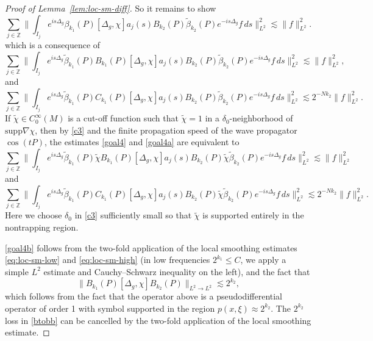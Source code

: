 \documentclass[10pt]{amsart}
\newcommand{\supp}{\mathrm{supp }}
\newcommand{\1}{{\bf 1}}
\begin{document}
\begin{proof}[Proof of Lemma~\ref{lem:loc-sm-diff}]
So it remains to show 
\begin{equation}\label{goal3}
   \sum_{j\in \mathbb{Z}}\| \int_{I_j} e^{is\Delta_{{g}}} \beta_{k_1}( P)[\Delta_g, \chi] a_j(s) B_{k_2}(P)\tilde\beta_{k_2}(P)   e^{-is\Delta_g}f\,ds\|^2_{L^2}\lesssim \|f\|^2_{L^2}.
\end{equation}
which is a consequence of 
\begin{equation}\label{goal4}
   \sum_{j\in \mathbb{Z}} \| \int_{I_j} e^{is\Delta_{{g}}}\tilde\beta_{k_1}(P)B_{k_1}(P)[\Delta_g, \chi]a_j(s) B_{k_2}(P)\tilde\beta_{k_2}(P)  e^{-is\Delta_g}f\,ds\|^2_{L^2}\lesssim \|f\|^2_{L^2},
\end{equation}
and 
\begin{equation}\label{goal4a}
  \sum_{j\in \mathbb{Z}} \| \int_{I_j} e^{is\Delta_{{g}}}\tilde\beta_{k_1}(P)C_{k_1}(P)[\Delta_g, \chi] a_j(s) B_{k_2}(P)\tilde\beta_{k_2}(P)  e^{-is\Delta_g} f \,ds\|^2_{L^2}\lesssim 2^{-Nk_2}\|f\|^2_{L^2}.
\end{equation}
If $\tilde \chi \in C_0^\infty(M)$ is a cut-off function such that $\tilde \chi = 1$ in a $\delta_0$-neighborhood of $\supp\nabla \chi$, then by \eqref{c3} and the finite propagation speed of the wave propagator $\cos(tP)$, the estimates \eqref{goal4} and \eqref{goal4a} are equivalent to
\begin{equation}\label{goal4b}
  \sum_{j\in \mathbb{Z}} \| \int_{I_j} e^{is\Delta_{{g}}}\tilde\beta_{k_1}(P)\tilde\chi B_{k_1}(P)[\Delta_g, \chi] a_j(s) B_{k_2}(P)\tilde\chi \tilde\beta_{k_2}(P) e^{-is\Delta_g} f\,ds\|^2_{L^2}\lesssim \|f\|^2_{L^2}
\end{equation}
and 
\begin{equation}\label{goal4c}
   \sum_{j\in \mathbb{Z}}\| \int_{I_j} e^{is\Delta_{{g}}}\tilde\beta_{k_1}(P) C_{k_1}(P)[\Delta_g, \chi] a_j(s) B_{k_2}(P)\tilde\chi\tilde\beta_{k_2}(P)  e^{-is\Delta_g}f \,ds\|^2_{L^2}\lesssim 2^{-Nk_2}\|f\|^2_{L^2}.
\end{equation}
Here we choose $\delta_0$ in \eqref{c3} sufficiently small so that  $\tilde \chi$ is supported entirely in the nontrapping region.

\eqref{goal4b} follows from the two-fold application of the local smoothing estimates \eqref{eq:loc-sm-low} and \eqref{eq:loc-sm-high} (in low frequencies $2^{k_1}\leq C$, we apply a simple $L^2$ estimate and Cauchy--Schwarz inequality on the left), and the fact that 
\begin{equation}\label{btob}
    \|B_{k_1}(P)[\Delta_g, \chi] B_{k_2}(P)\|_{L^2\to L^2}\lesssim 2^{k_2},
\end{equation}
which follows from the fact that the operator above is a pseudodifferential operator of order 1 with symbol supported in the region $p(x,\xi)\approx 2^{k_2}$. 
The  $2^{k_2}$ loss in \eqref{btobb} can be cancelled by the two-fold application of the local smoothing estimate.



\end{proof}
\end{document}
